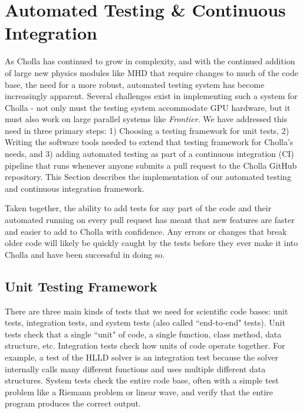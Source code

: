 \section{Automated Testing \& Continuous Integration}
\label{sec:testing}

As Cholla has continued to grow in complexity, and with the continued addition of large new physics modules like MHD that require changes to much of the code base, the need for a more robust, automated testing system has become increasingly apparent. Several challenges exist in implementing such a system for Cholla - not only must the testing system accommodate GPU hardware, but it must also work on large parallel systems like \textit{Frontier}. We have addressed this need in three primary steps: 1) Choosing a testing framework for unit tests, 2) Writing the software tools needed to extend that testing framework for Cholla's needs, and 3) adding automated testing as part of a continuous integration (CI) pipeline that runs whenever anyone submits a pull request to the Cholla GitHub repository. This Section describes the implementation of our automated testing and continuous integration framework.

Taken together, the ability to add tests for any part of the code and their automated running on every pull request has meant that new features are faster and easier to add to Cholla with confidence. Any errors or changes that break older code will likely be quickly caught by the tests before they ever make it into Cholla and have been successful in doing so.

\subsection{Unit Testing Framework}
\label{sec:testing-framework}

There are three main kinds of tests that we need for scientific code bases: unit tests, integration tests, and system tests (also called ``end-to-end" tests). Unit tests check that a single ``unit" of code, a single function, class method, data structure, etc. Integration tests check how units of code operate together. For example, a test of the HLLD solver is an integration test because the solver internally calls many different functions and uses multiple different data structures. System tests check the entire code base, often with a simple test problem like a Riemann problem or linear wave, and verify that the entire program produces the correct output.


